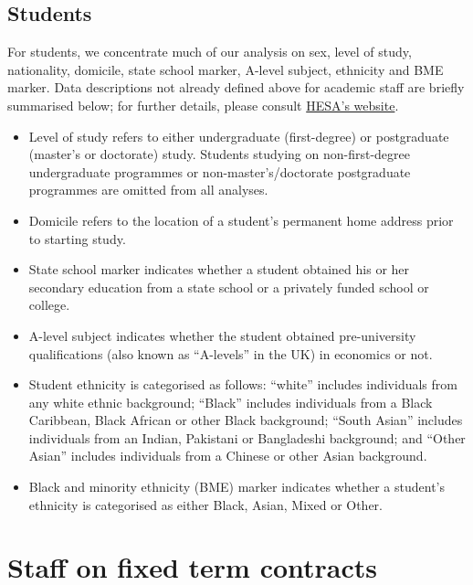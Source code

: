 \documentclass[a4paper, 1]{article}
\begin{document}
\hypertarget{students-definitions}{%
\subsection*{Students}\label{students-definitions}}

For students, we concentrate much of our analysis on sex, level of study, nationality, domicile, state school marker, A-level subject, ethnicity and BME marker. Data descriptions not already defined above for academic staff are briefly summarised below; for further details, please consult \href{https://www.hesa.ac.uk/support/definitions/students}{HESA's website}.

\begin{itemize}
\item
  Level of study refers to either undergraduate (first-degree) or postgraduate (master's or doctorate) study. Students studying on non-first-degree undergraduate programmes or non-master's/doctorate postgraduate programmes are omitted from all analyses.
\item
  Domicile refers to the location of a student's permanent home address prior to starting study.
\item
  State school marker indicates whether a student obtained his or her secondary education from a state school or a privately funded school or college.
\item
  A-level subject indicates whether the student obtained pre-university qualifications (also known as ``A-levels'' in the UK) in economics or not.
\item
  Student ethnicity is categorised as follows: ``white'' includes individuals from any white ethnic background; ``Black'' includes individuals from a Black Caribbean, Black African or other Black background; ``South Asian'' includes individuals from an Indian, Pakistani or Bangladeshi background; and ``Other Asian'' includes individuals from a Chinese or other Asian background.
\item
  Black and minority ethnicity (BME) marker indicates whether a student's ethnicity is categorised as either Black, Asian, Mixed or Other.
\end{itemize}

\newpage

\hypertarget{sec:temp-appendix}{%
\section{Staff on fixed term contracts}\label{sec:temp-appendix}}
\end{document}
